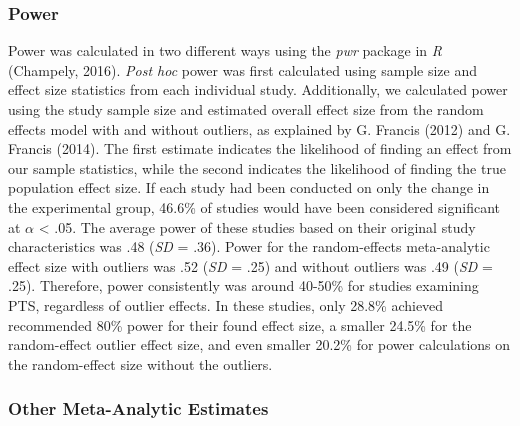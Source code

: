 \documentclass[man, mask]{apa6}
\theoremstyle{definition}
\theoremstyle{definition}
\theoremstyle{definition}
\theoremstyle{remark}
\begin{document}
\subsubsection{Power}\label{power}

Power was calculated in two different ways using the \emph{pwr} package
in \emph{R} (Champely, 2016). \emph{Post hoc} power was first calculated
using sample size and effect size statistics from each individual study.
Additionally, we calculated power using the study sample size and
estimated overall effect size from the random effects model with and
without outliers, as explained by G. Francis (2012) and G. Francis
(2014). The first estimate indicates the likelihood of finding an effect
from our sample statistics, while the second indicates the likelihood of
finding the true population effect size. If each study had been
conducted on only the change in the experimental group, 46.6\% of
studies would have been considered significant at \(\alpha\) \textless{}
.05. The average power of these studies based on their original study
characteristics was .48 (\emph{SD} = .36). Power for the random-effects
meta-analytic effect size with outliers was .52 (\emph{SD} = .25) and
without outliers was .49 (\emph{SD} = .25). Therefore, power
consistently was around 40-50\% for studies examining PTS, regardless of
outlier effects. In these studies, only 28.8\% achieved recommended 80\%
power for their found effect size, a smaller 24.5\% for the
random-effect outlier effect size, and even smaller 20.2\% for power
calculations on the random-effect size without the outliers.

\subsubsection{Other Meta-Analytic
Estimates}\label{other-meta-analytic-estimates}
\end{document}
